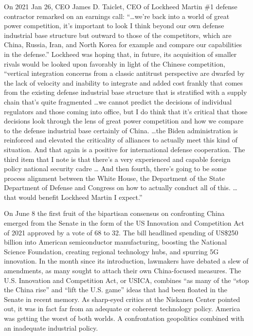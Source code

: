 \documentclass[
]{book}
\begin{document}
On 2021 Jan 26, CEO James D. Taiclet, CEO of Lockheed Martin \#1 defense contractor remarked on an earnings call:
``\ldots we're back into a world of great power competition, it's important to look I think beyond our own defense industrial base structure but outward to those of the competitors, which are China, Russia, Iran, and North Korea for example and compare our capabilities in the defense.'' Lockheed was hoping that, in future, its acquisition of smaller rivals would be looked upon favorably in light of the Chinese competition, ``vertical integration concerns from a classic antitrust perspective are dwarfed by the lack of velocity and inability to integrate and added cost frankly that comes from the existing defense industrial base structure that is stratified with a supply chain that's quite fragmented \ldots we cannot predict the decisions of individual regulators and those coming into office, but I do think that it's critical that those decisions look through the lens of great power competition and how we compare to the defense industrial base certainly of China. \ldots the Biden administration is reinforced and elevated the criticality of alliances to actually meet this kind of situation. And that again is a positive for international defense cooperation. The third item that I note is that there's a very experienced and capable foreign policy national security cadre \ldots{} And then fourth, there's going to be some process alignment between the White House, the Department of the State Department of Defense and Congress on how to actually conduct all of this. \ldots{} that would benefit Lockheed Martin I expect.''

On June 8 the first fruit of the bipartisan consensus on confronting China emerged from the Senate in the form of the US Innovation and Competition Act of 2021 approved by a vote of 68 to 32. The bill headlined spending of US\$250 billion into American semiconductor manufacturing, boosting the National Science Foundation, creating regional technology hubs, and spurring 5G innovation. In the month since its introduction, lawmakers have debated a slew of amendments, as many sought to attach their own China-focused measures. The U.S. Innovation and Competition Act, or USICA, combines ``as many of the ``stop the China rise'' and ``lift the U.S. game'' ideas that had been floated in the Senate in recent memory. As sharp-eyed critics at the Niskanen Center pointed out, it was in fact far from an adequate or coherent technology policy. America was getting the worst of both worlds. A confrontation geopolitics combined with an inadequate industrial policy.
\end{document}
